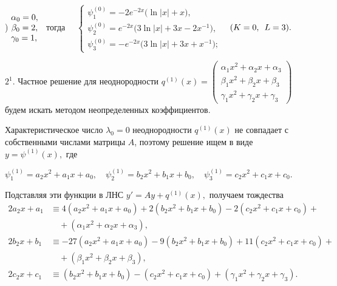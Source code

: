 \documentclass[11pt]{article}
\begin{document}
{) $\begin{matrix} \alpha_0 = 0,\hfill\\ \beta_0 = 2,\\ \gamma_0 = 1,\hfill \end{matrix}$ \
тогда \ \ $\begin{cases}
\psi_1^{(0)} = -2e^{-2x} \big(\ln |x| + x\big), \\
\psi_2^{(0)} = e^{-2x} \big(3\ln |x| + 3x - 2x^{-1} \big), \\
\psi_3^{(0)} = -e^{-2x} \big(3\ln |x| + 3x + x^{-1} \big);
\end{cases}$ \
$(K=0, \hspace{0.5em} L=3).$


\smallskip
$2^1.$ Частное решение для неоднородности $q^{(1)}(x) = \begin{pmatrix} \alpha_1 x^2 + \alpha_2 x + \alpha_3 \\ \beta_1 x^2 + \beta_2 x + \beta_3 \\ \gamma_1 x^2 + \gamma_2 x + \gamma_3 \end{pmatrix}$ будем искать методом неопределенных коэффициентов.

Характеристическое число $\lambda_0=0$ неоднородности $q^{(1)}(x)$ не совпадает с собственными числами матрицы $A$,
поэтому решение ищем в виде $y=\psi^{(1)}(x),$ где

\smallskip
$\psi_1^{(1)} = a_2 x^2 + a_1 x + a_0, \quad \psi_2^{(1)} = b_2 x^2 + b_1 x + b_0, \quad \psi_3^{(1)} = c_2 x^2 + c_1 x + c_0.$

\smallskip
Подставляя эти функции в ЛНС $y'=Ay+q^{(1)}(x),$ получаем тождества
\begin{align*}
2a_2 x + a_1 &\equiv 4(a_2 x^2 + a_1 x + a_0) + 2(b_2 x^2 + b_1 x + b_0) - 2(c_2 x^2 + c_1 x + c_0) +\\
             &\quad + (\alpha_1 x^2 + \alpha_2 x + \alpha_3), \\
2b_2 x + b_1 &\equiv -27(a_2 x^2 + a_1 x + a_0) - 9(b_2 x^2 + b_1 x + b_0) + 11(c_2 x^2 + c_1 x + c_0) +\\
             &\quad + (\beta_1 x^2 + \beta_2 x + \beta_3), \\
2c_2 x + c_1 &\equiv (b_2 x^2 + b_1 x + b_0) - (c_2 x^2 + c_1 x + c_0) + (\gamma_1 x^2 + \gamma_2 x + \gamma_3).
\end{align*}

}
\end{document}
